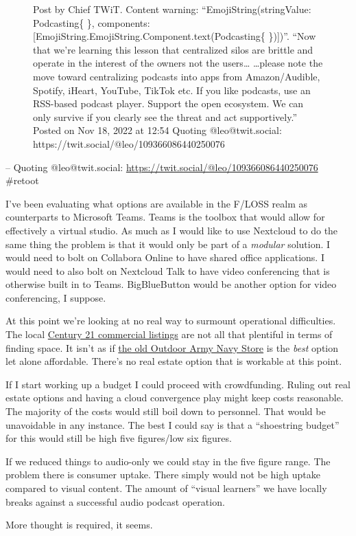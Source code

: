 \begin{figure}
\centering
{}
\caption{Post by Chief TWiT. Content warning: ``EmojiString(stringValue:
Podcasting\{ \}, components:
{[}EmojiString.EmojiString.Component.text(Podcasting\{ \}){]})''. ``Now
that we're learning this lesson that centralized silos are brittle and
operate in the interest of the owners not the users\ldots{}
\ldots please note the move toward centralizing podcasts into apps from
Amazon/Audible, Spotify, iHeart, YouTube, TikTok etc. If you like
podcasts, use an RSS-based podcast player. Support the open ecosystem.
We can only survive if you clearly see the threat and act
supportively.'' Posted on Nov 18, 2022 at 12:54 Quoting
@leo@twit.social: https://twit.social/@leo/109366086440250076}
\end{figure}

-- Quoting @leo@twit.social:
\url{https://twit.social/@leo/109366086440250076} \#retoot

I've been evaluating what options are available in the F/LOSS realm as
counterparts to Microsoft Teams. Teams is the toolbox that would allow
for effectively a virtual studio. As much as I would like to use
Nextcloud to do the same thing the problem is that it would only be part
of a \emph{modular} solution. I would need to bolt on Collabora Online
to have shared office applications. I would need to also bolt on
Nextcloud Talk to have video conferencing that is otherwise built in to
Teams. BigBlueButton would be another option for video conferencing, I
suppose.

At this point we're looking at no real way to surmount operational
difficulties. The local
\href{https://commercial.century21.com/real-estate/ashtabula-county-oh/LNOHASHTABULA/?kw=&pt=}{Century
21 commercial listings} are not all that plentiful in terms of finding
space. It isn't as if
\href{https://www.remaxcommercial.com/ListingDetails/4420-Main-Avenue-Ashtabula-OH-44004/1023527830}{the
old Outdoor Army Navy Store} is the \emph{best} option let alone
affordable. There's no real estate option that is workable at this
point.

If I start working up a budget I could proceed with crowdfunding. Ruling
out real estate options and having a cloud convergence play might keep
costs reasonable. The majority of the costs would still boil down to
personnel. That would be unavoidable in any instance. The best I could
say is that a ``shoestring budget'' for this would still be high five
figures/low six figures.

If we reduced things to audio-only we could stay in the five figure
range. The problem there is consumer uptake. There simply would not be
high uptake compared to visual content. The amount of ``visual
learners'' we have locally breaks against a successful audio podcast
operation.

More thought is required, it seems.
